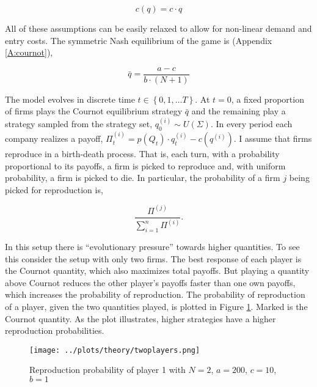 \documentclass[american]{scrartcl}
\newcommand{\set}[1]{\left\{#1\right\}}
\begin{document}
\begin{equation}
    c(q) = c \cdot q
\end{equation}

All of these assumptions can be easily relaxed to allow for non-linear demand and entry costs. The symmetric Nash equilibrium of the game is (Appendix \ref{A:cournot}),

\begin{equation} \label{equilib}
    \bar{q}= \frac{a - c}{b \cdot (N+1)}
\end{equation}

The model evolves in discrete time $t \in \set{0, 1, \ldots T}$. At $t = 0$, a fixed proportion of firms plays the Cournot equilibrium strategy $\bar{q}$ and the remaining play a strategy sampled from the strategy set, $q^{(i)}_0 \sim U(\Sigma)$. In every period each company realizes a payoff, $\Pi^{(i)}_t = p(Q_t) \cdot q^{(i)}_t - c(q^{(i)})$. I assume that firms reproduce in a birth-death process. That is, each turn, with a probability proportional to its payoffs, a firm is picked to reproduce and, with uniform probability, a firm is picked to die. In particular, the probability of a firm $j$ being picked for reproduction is,

\begin{equation}
    \frac{\Pi^{(j)}}{\sum^n_{i = 1} \Pi^{(i)}}.
\end{equation}

In this setup there is ``evolutionary pressure'' towards higher quantities. To see this consider the setup with only two firms. The best response of each player is the Cournot quantity, which also maximizes total payoffs. But playing a quantity above Cournot reduces the other player's payoffs faster than one own payoffs, which increases the probability of reproduction. The probability of reproduction of a player, given the two quantities played, is plotted in Figure \ref{fig:relprob}. Marked is the Cournot quantity. As the plot illustrates, higher strategies have a higher reproduction probabilities.

\begin{center}
    \begin{figure}[H]
        \center
        \texttt{[image: ../plots/theory/twoplayers.png]}
        \caption{Reproduction probability of player 1 with $N = 2$, $a = 200$, $c = 10$, $b = 1$}
        \label{fig:relprob}
    \end{figure}
\end{center}
\end{document}
